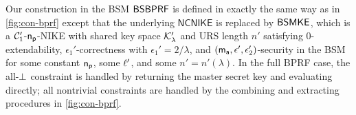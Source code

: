 Our construction in the BSM $\mathsf{BSBPRF}$ is defined in exactly the same way as in \cref{fig:con-bprf} except that the underlying $\mathsf{NCNIKE}$ is replaced by ${\mathsf{BSMKE}}$, which is a $\mathcal{C}_1^{\prime}$-$\mathsf{n_p}$-NIKE with shared key space $\mathcal{K}_{\lambda}'$ and URS length $n'$ satisfying $0$-extendability, $\epsilon_1'$-correctness with $\epsilon_1'=2/\lambda$, and $(\mathsf{m_a}, \epsilon^{\prime}, \epsilon_2')$-security in the BSM for some constant $\mathsf{n_p}$, some $\ell'$, and some $n' = n'(\lambda)$.
In the full BPRF case, the all-$\bot$ constraint is handled by returning the master secret key and evaluating directly; all nontrivial constraints are handled by the combining and extracting procedures in \cref{fig:con-bprf}.
